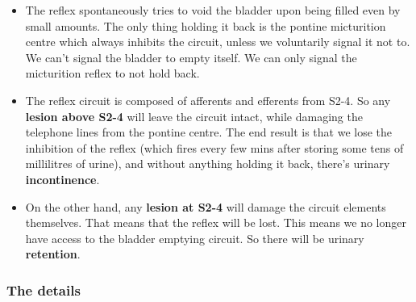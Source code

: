 \documentclass[
  12pt,
]{memoir}
\providecommand{\tightlist}{%
  \setlength{\itemsep}{0pt}\setlength{\parskip}{0pt}}
\begin{document}
\begin{itemize}
\tightlist
\item
  The reflex spontaneously tries to void the bladder upon being filled
  even by small amounts. The only thing holding it back is the pontine
  micturition centre which always inhibits the circuit, unless we
  voluntarily signal it not to. We can't signal the bladder to empty
  itself. We can only signal the micturition reflex to not hold back.
\item
  The reflex circuit is composed of afferents and efferents from S2-4.
  So any \textbf{lesion above S2-4} will leave the circuit intact, while
  damaging the telephone lines from the pontine centre. The end result
  is that we lose the inhibition of the reflex (which fires every few
  mins after storing some tens of millilitres of urine), and without
  anything holding it back, there's urinary \textbf{incontinence}.
\item
  On the other hand, any \textbf{lesion at S2-4} will damage the circuit
  elements themselves. That means that the reflex will be lost. This
  means we no longer have access to the bladder emptying circuit. So
  there will be urinary \textbf{retention}.
\end{itemize}

\pagebreak

\hypertarget{the-details}{%
\subsubsection{The details}\label{the-details}}
\end{document}
